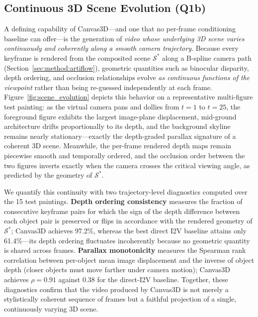 \subsection{Continuous 3D Scene Evolution (Q1b)}

A defining capability of Canvas3D---and one that no per-frame
conditioning baseline can offer---is the generation of \emph{video
whose underlying 3D scene varies continuously and coherently along a
smooth camera trajectory}. Because every keyframe is rendered from
the composited scene $\mathcal{S}^{*}$ along a B-spline camera path
(Section~\ref{sec:method:artiflow}), geometric quantities such as
binocular disparity, depth ordering, and occlusion relationships
evolve \emph{as continuous functions of the viewpoint} rather than
being re-guessed independently at each frame.
Figure~\ref{fig:scene_evolution} depicts this behavior on a
representative multi-figure test painting: as the virtual camera pans
and dollies from $t{=}1$ to $t{=}25$, the foreground figure exhibits
the largest image-plane displacement, mid-ground architecture drifts
proportionally to its depth, and the background skyline remains nearly
stationary---exactly the depth-graded parallax signature of a coherent
3D scene. Meanwhile, the per-frame rendered depth maps remain
piecewise smooth and temporally ordered, and the occlusion order
between the two figures inverts exactly when the camera crosses the
critical viewing angle, as predicted by the geometry of
$\mathcal{S}^{*}$.

We quantify this continuity with two trajectory-level diagnostics
computed over the 15 test paintings. \textbf{Depth ordering
consistency} measures the fraction of consecutive keyframe pairs for
which the sign of the depth difference between each object pair is
preserved or flips in accordance with the rendered geometry of
$\mathcal{S}^{*}$; Canvas3D achieves 97.2\%, whereas the best direct
I2V baseline attains only 61.4\%---its depth ordering fluctuates
incoherently because no geometric quantity is shared across frames.
\textbf{Parallax monotonicity} measures the Spearman rank correlation
between per-object mean image displacement and the inverse of object
depth (closer objects must move farther under camera motion); Canvas3D
achieves $\rho = 0.91$ against $0.38$ for the direct-I2V baseline.
Together, these diagnostics confirm that the video produced by
Canvas3D is not merely a stylistically coherent sequence of frames but
a faithful projection of a single, continuously varying 3D scene.

